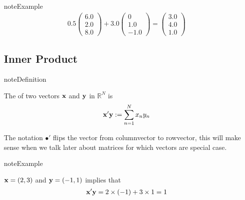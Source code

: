 \documentclass[letterpaper,10pt,english]{jupyterBook}
\begin{document}
\begin{sphinxadmonition}{note}{Example}
\begin{equation*}
\begin{split}
%
0.5 \left(
\begin{array}{c}
6.0 \\
2.0 \\
8.0
\end{array}
\right)
+
3.0 \left(
\begin{array}{c}
0 \\
1.0 \\
-1.0
\end{array}
\right)
=
\left(
\begin{array}{c}
3.0 \\
4.0 \\
1.0
\end{array}
\right)
%
\end{split}
\end{equation*}\end{sphinxadmonition}


\subsection{Inner Product}
\label{\detokenize{05.linear_algebra:inner-product}}
\begin{sphinxadmonition}{note}{Definition}

\sphinxAtStartPar
The  of two vectors \({\bf x}\) and \({\bf y}\) in \(\mathbb{R}^N\) is
\begin{equation*}
\begin{split}
%
{\bf x}' {\bf y} :=
\sum_{n=1}^N x_n y_n
%
\end{split}
\end{equation*}\end{sphinxadmonition}

\sphinxAtStartPar
The notation \(\bullet '\) flips the vector from column\sphinxhyphen{}vector to row\sphinxhyphen{}vector, this will make sense when we talk later about matrices for which vectors are special case.

\begin{sphinxadmonition}{note}{Example}

\sphinxAtStartPar
\({\bf x} = (2, 3)\) and \({\bf y} = (-1, 1)\) implies that
\begin{equation*}
\begin{split}
%
{\bf x}' {\bf y} 
= 2 \times (-1) + 3 \times 1 
= 1
%
\end{split}
\end{equation*}\end{sphinxadmonition}
\end{document}
